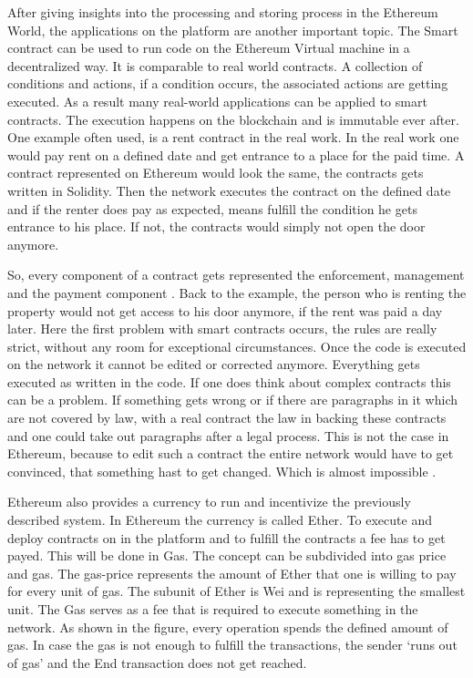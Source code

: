 After giving insights into the processing and storing process in the Ethereum World, the applications on the platform are another important topic.
The Smart contract can be used to run code on the Ethereum Virtual machine in a decentralized way. 
It is comparable to real world contracts. 
A collection of conditions and actions, if a condition occurs, the associated actions are getting executed. 
As a result many real-world applications can be applied to smart contracts. 
The execution happens on the blockchain and is immutable ever after. 
One example often used, is a rent contract in the real work. 
In the real work one would pay rent on a defined date and get entrance to a place for the paid time. A contract represented on Ethereum would look the same, the contracts gets written in Solidity. 
Then the network executes the contract on the defined date and if the renter does pay as expected, means fulfill the condition he gets entrance to his place. If not, the contracts would simply not open the door anymore. 

So, every component of a contract gets represented the enforcement, management and the payment component \cite{Dannen2017IES3103305}.
Back to the example, the person who is renting the property would not get access to his door anymore, if the rent was paid a day later. 
Here the first problem with smart contracts occurs, the rules are really strict, without any room for exceptional circumstances. 
Once the code is executed on the network it cannot be edited or corrected anymore. 
Everything gets executed as written in the code. 
If one does think about complex contracts this can be a problem.
If something gets wrong or if there are paragraphs in it which are not covered by law, with a real contract the law in backing these contracts and one could take out paragraphs after a legal process.
This is not the case in Ethereum, because to edit such a contract the entire network would have to get convinced, that something hast to get changed. Which is almost impossible \cite{Dannen2017IES3103305}.

Ethereum also provides a currency to run and incentivize the previously described system. 
In Ethereum the currency is called Ether. 
To execute and deploy contracts on in the platform and to fulfill the contracts a fee has to get payed.
This will be done in Gas. The concept can be subdivided into gas price and gas. 
The gas-price represents the amount of Ether that one is willing to pay for every unit of gas. 
The subunit of Ether is Wei and is representing the smallest unit. 
The Gas serves as a fee that is required to execute something in the network. 
As shown in the figure, every operation spends the defined amount of gas. 
In case the gas is not enough to fulfill the transactions, the sender ‘runs out of gas’ and the End transaction does not get reached. 



